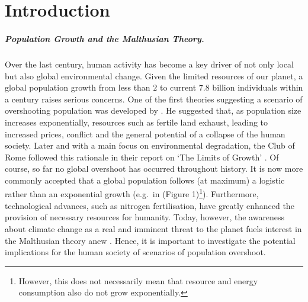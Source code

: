 
\chapter{Introduction}\label{chapter:Introduction}

\paragraph{Population Growth and the Malthusian Theory.}
Over the last century, human activity has become a key driver of not only local but also global environmental change. %
Given the limited resources of our planet, a global population growth from less than $2$ to current $7.8$ billion individuals within a century raises serious concerns.%
One of the first theories suggesting a scenario of overshooting population was developed by \citet{Malthus1798}. %
He suggested that, as population size increases exponentially, resources such as fertile land exhaust, leading to increased prices, conflict and the general potential of a collapse of the human society.
Later and with a main focus on environmental degradation, the Club of Rome followed this rationale in their report on `The Limits of Growth' \citep{clubofrome1972}.
Of course, so far no global overshoot has occurred throughout history. 
It is now more commonly accepted that a global population follows (at maximum) a logistic rather than an exponential growth (e.g.\ in  (Figure 1)\footnote{However, this does not necessarily mean that resource and energy consumption also do not grow exponentially.}). 
Furthermore, technological advances, such as nitrogen fertilisation, have greatly enhanced the provision of necessary resources for humanity.
Today, however, the awareness about climate change as a real and imminent threat to the planet fuels interest in the Malthusian theory anew \citep{Reuveny2012}.
Hence, it is important to investigate the potential implications for the human society of scenarios of population overshoot.




